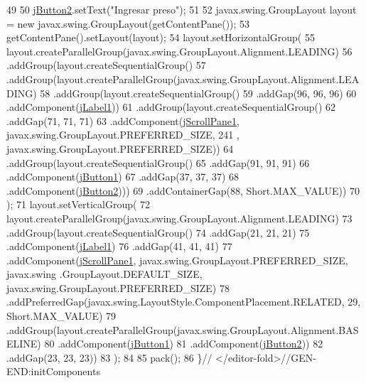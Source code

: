 \begin{DoxyCode}
49 
50         \mbox{\hyperlink{classsoftware_1_1_gestiondealtas_ac9d4185d1fb15805001c5adb3dd68576}{jButton2}}.setText(\textcolor{stringliteral}{"Ingresar preso"});
51 
52         javax.swing.GroupLayout layout = \textcolor{keyword}{new} javax.swing.GroupLayout(getContentPane());
53         getContentPane().setLayout(layout);
54         layout.setHorizontalGroup(
55             layout.createParallelGroup(javax.swing.GroupLayout.Alignment.LEADING)
56             .addGroup(layout.createSequentialGroup()
57                 .addGroup(layout.createParallelGroup(javax.swing.GroupLayout.Alignment.LEADING)
58                     .addGroup(layout.createSequentialGroup()
59                         .addGap(96, 96, 96)
60                         .addComponent(\mbox{\hyperlink{classsoftware_1_1_gestiondealtas_a0ef50908d3fbffb4f2704062e57ee873}{jLabel1}}))
61                     .addGroup(layout.createSequentialGroup()
62                         .addGap(71, 71, 71)
63                         .addComponent(\mbox{\hyperlink{classsoftware_1_1_gestiondealtas_aaae4daa1d692c7fbf9d53666e54cee13}{jScrollPane1}}, javax.swing.GroupLayout.PREFERRED\_SIZE, 241
      , javax.swing.GroupLayout.PREFERRED\_SIZE))
64                     .addGroup(layout.createSequentialGroup()
65                         .addGap(91, 91, 91)
66                         .addComponent(\mbox{\hyperlink{classsoftware_1_1_gestiondealtas_ae72c1863bf05ff8d6bf46ebbba12a891}{jButton1}})
67                         .addGap(37, 37, 37)
68                         .addComponent(\mbox{\hyperlink{classsoftware_1_1_gestiondealtas_ac9d4185d1fb15805001c5adb3dd68576}{jButton2}})))
69                 .addContainerGap(88, Short.MAX\_VALUE))
70         );
71         layout.setVerticalGroup(
72             layout.createParallelGroup(javax.swing.GroupLayout.Alignment.LEADING)
73             .addGroup(layout.createSequentialGroup()
74                 .addGap(21, 21, 21)
75                 .addComponent(\mbox{\hyperlink{classsoftware_1_1_gestiondealtas_a0ef50908d3fbffb4f2704062e57ee873}{jLabel1}})
76                 .addGap(41, 41, 41)
77                 .addComponent(\mbox{\hyperlink{classsoftware_1_1_gestiondealtas_aaae4daa1d692c7fbf9d53666e54cee13}{jScrollPane1}}, javax.swing.GroupLayout.PREFERRED\_SIZE, javax.swing
      .GroupLayout.DEFAULT\_SIZE, javax.swing.GroupLayout.PREFERRED\_SIZE)
78                 .addPreferredGap(javax.swing.LayoutStyle.ComponentPlacement.RELATED, 29, Short.MAX\_VALUE)
79                 .addGroup(layout.createParallelGroup(javax.swing.GroupLayout.Alignment.BASELINE)
80                     .addComponent(\mbox{\hyperlink{classsoftware_1_1_gestiondealtas_ae72c1863bf05ff8d6bf46ebbba12a891}{jButton1}})
81                     .addComponent(\mbox{\hyperlink{classsoftware_1_1_gestiondealtas_ac9d4185d1fb15805001c5adb3dd68576}{jButton2}}))
82                 .addGap(23, 23, 23))
83         );
84 
85         pack();
86     \}\textcolor{comment}{// </editor-fold>//GEN-END:initComponents}
\end{DoxyCode}
\mbox{\label{classsoftware_1_1_gestiondealtas_a07b517e675deeae33168917974b29ca8}} 
